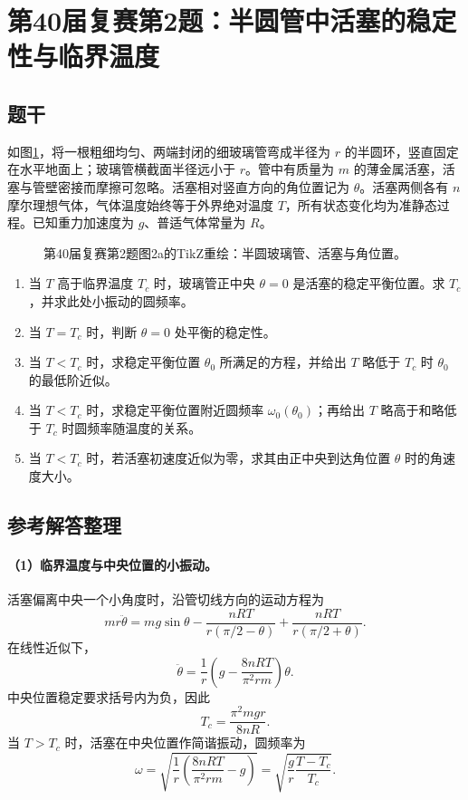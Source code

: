 \section{第40届复赛第2题：半圆管中活塞的稳定性与临界温度}

\subsection{题干}

如图\ref{fig:cpho40q02}，将一根粗细均匀、两端封闭的细玻璃管弯成半径为 $r$ 的半圆环，竖直固定在水平地面上；玻璃管横截面半径远小于 $r$。管中有质量为 $m$ 的薄金属活塞，活塞与管壁密接而摩擦可忽略。活塞相对竖直方向的角位置记为 $\theta$。活塞两侧各有 $n$ 摩尔理想气体，气体温度始终等于外界绝对温度 $T$，所有状态变化均为准静态过程。已知重力加速度为 $g$、普适气体常量为 $R$。

\begin{figure}[htbp]
  \centering
  
  \caption{第40届复赛第2题图2a的TikZ重绘：半圆玻璃管、活塞与角位置。}
  \label{fig:cpho40q02}
\end{figure}

\begin{enumerate}
  \item 当 $T$ 高于临界温度 $T_c$ 时，玻璃管正中央 $\theta=0$ 是活塞的稳定平衡位置。求 $T_c$，并求此处小振动的圆频率。
  \item 当 $T=T_c$ 时，判断 $\theta=0$ 处平衡的稳定性。
  \item 当 $T<T_c$ 时，求稳定平衡位置 $\theta_0$ 所满足的方程，并给出 $T$ 略低于 $T_c$ 时 $\theta_0$ 的最低阶近似。
  \item 当 $T<T_c$ 时，求稳定平衡位置附近圆频率 $\omega_0(\theta_0)$；再给出 $T$ 略高于和略低于 $T_c$ 时圆频率随温度的关系。
  \item 当 $T<T_c$ 时，若活塞初速度近似为零，求其由正中央到达角位置 $\theta$ 时的角速度大小。
\end{enumerate}

\subsection{参考解答整理}

\paragraph{（1）临界温度与中央位置的小振动。}
活塞偏离中央一个小角度时，沿管切线方向的运动方程为
\[
mr\ddot\theta=mg\sin\theta-
\frac{nRT}{r(\pi/2-\theta)}+
\frac{nRT}{r(\pi/2+\theta)}.
\]
在线性近似下，
\[
\ddot\theta=\frac1r\left(g-\frac{8nRT}{\pi^2rm}\right)\theta.
\]
中央位置稳定要求括号内为负，因此
\[
T_c=\frac{\pi^2mgr}{8nR}.
\]
当 $T>T_c$ 时，活塞在中央位置作简谐振动，圆频率为
\[
\omega=\sqrt{\frac1r\left(\frac{8nRT}{\pi^2rm}-g\right)}
=\sqrt{\frac gr\frac{T-T_c}{T_c}}.
\]

